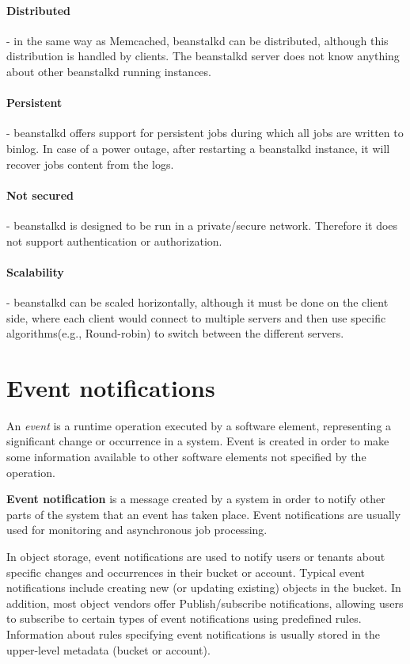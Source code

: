     \paragraph{Distributed}- in the same way as Memcached, beanstalkd can be distributed, although this distribution is handled by clients. The beanstalkd server does not know anything about other beanstalkd running instances.
    \paragraph{Persistent}- beanstalkd offers support for persistent jobs during which all jobs are written to binlog. In case of a power outage, after restarting a beanstalkd instance, it will recover jobs content from the logs.
    \paragraph{Not secured}- beanstalkd is designed to be run in a private/secure network. Therefore it does not support authentication or authorization.
    \paragraph{Scalability}- beanstalkd can be scaled horizontally, although it must be done on the client side, where each client would connect to multiple servers and then use specific algorithms(e.g., Round-robin) to switch between the different servers.

\section{Event notifications}
    An \textit{event} is a runtime operation executed by a software element, representing a significant change or occurrence in a system. Event is created in order to make some information available to other software elements not specified by the operation\cite{eventArchitecturalPatterns}.

    \textbf{Event notification} is a message created by a system in order to notify other parts of the system that an event has taken place\cite{eventRedHatEventDrivenArch}. Event notifications are usually used for monitoring and asynchronous job processing.

    In object storage, event notifications are used to notify users or tenants about specific changes and occurrences in their bucket or account. Typical event notifications include creating new (or updating existing) objects in the bucket. In addition, most object vendors offer Publish/subscribe notifications, allowing users to subscribe to certain types of event notifications using predefined rules. Information about rules specifying event notifications is usually stored in the upper-level metadata (bucket or account).

